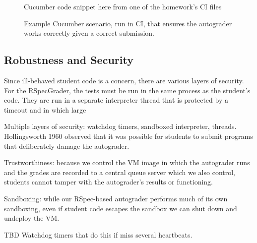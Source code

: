 \begin{figure}
  Cucumber code snippet here from one of the homework's CI files
  \caption{\label{fig:rag-ci}%
Example Cucumber scenario, run in CI, that ensures the autograder works
correctly given a correct submission.
}
\end{figure}


\subsection{Robustness and Security}

Since ill-behaved student code is a concern, there are various layers of
security.  For the RSpecGrader, the tests must be run in the same
process as the student's code.  They are run in a separate interpreter
thread that is protected by a timeout and in which large 

Multiple layers of security: watchdog timers, sandboxed interpreter, threads. Hollingsworth 1960 observed that it was possible for students to submit programs that deliberately damage the autograder.

Trustworthiness: because we control the VM image in which the
  autograder runs and the grades are recorded to a central queue server
  which we also control, students cannot tamper with the autograder's
  results or functioning.

Sandboxing: while our RSpec-based autograder performs much of its
  own sandboxing, even if student code escapes the sandbox we can shut
  down and undeploy the VM.  

  TBD Watchdog timers that do this if miss several heartbeats.




